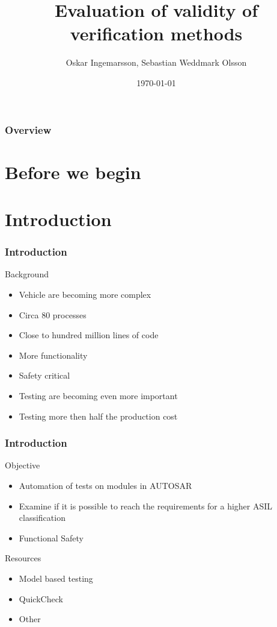 \documentclass{beamer}
\title{Evaluation of validity of verification methods}
\author{Oskar Ingemarsson, Sebastian Weddmark Olsson}
\institute{Chalmers University of Technology, Mecel AB}
\date{\today}
\begin{document}
\begin{frame}
  \titlepage
\end{frame}

\begin{frame}
  \frametitle{Overview}
  \tableofcontents
\end{frame}

\section{Before we begin}


\section{Introduction}

\begin{frame}[fragile]
  \frametitle{Introduction}
  \begin{block}{Background}
    \begin{itemize}
        \item Vehicle are becoming more complex
        \item Circa 80 processes
        \item Close to hundred million lines of code
        \item More functionality
        \item Safety critical
        \item Testing are becoming even more important
        \item Testing more then half the production cost
    \end{itemize}
   \end{block}
\end{frame}

\begin{frame}[fragile]
  \frametitle{Introduction}
  \begin{block}{Objective}
    \begin{itemize}
        \item Automation of tests on modules in AUTOSAR
        \item Examine if it is possible to reach the requirements for
          a higher ASIL classification
        \item Functional Safety
    \end{itemize}
   \end{block}
  \begin{block}{Resources}
    \begin{itemize}
        \item Model based testing
        \item QuickCheck
        \item Other
    \end{itemize}
  \end{block}
\end{frame}
\end{document}
